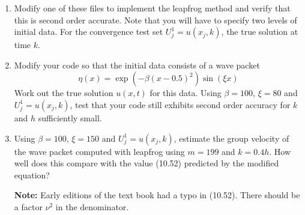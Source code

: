 \documentclass[10pt]{article}
\begin{document}
\begin{enumerate}
\item Modify one of these files to 
implement the leapfrog method and verify that this is second order accurate.
Note that you will have to specify two levels of initial data.  For the
convergence test set $U^1_j = u(x_j,k)$, the true solution at time $k$.

\item Modify your code so that the initial data consists of
a wave packet
\[
\eta(x) = \exp(-\beta(x-0.5)^2) \sin(\xi x)
\]
Work out the true solution $u(x,t)$ for this data.
Using $\beta = 100$, $\xi=80$ and $U^1_j = u(x_j,k)$, test that your code
still exhibits second order accuracy for $k$ and $h$ sufficiently small.

\item Using $\beta = 100$, $\xi=150$ and $U^1_j = u(x_j,k)$, estimate the
group velocity of the wave packet computed with leapfrog using $m=199$ and
$k = 0.4h$.  How well does this compare with the  value (10.52) predicted by
the modified equation?  

{\bf Note:} Early editions of the text book had a typo in (10.52).  There should be a factor $\nu^2$ in the denominator.

\end{enumerate} 



\end{document}
